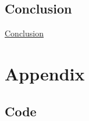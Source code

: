\documentclass[american,]{article}
\begin{document}
\hypertarget{conclusion-1}{%
\subsection{Conclusion}\label{conclusion-1}}

\protect\hyperlink{conclusion-1}{Conclusion}

\newpage

\hypertarget{appendix}{%
\section{Appendix}\label{appendix}}

\hypertarget{code}{%
\subsection{Code}\label{code}}

\newpage

\renewcommand\refname{References}

\end{document}
